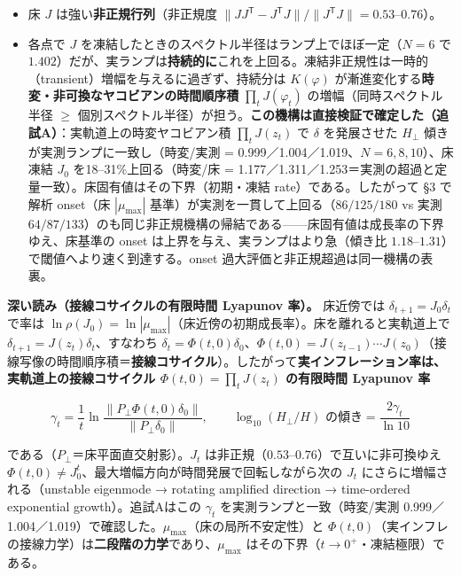 \documentclass[
  a4paper,
]{ltjsarticle}
\providecommand{\tightlist}{%
  \setlength{\itemsep}{0pt}\setlength{\parskip}{0pt}}
\begin{document}
\begin{itemize}
\tightlist
\item
  床 \(J\) は強い\textbf{非正規行列}（非正規度
  \(\|JJ^{\mathsf T}-J^{\mathsf T}J\|/\|J^{\mathsf T}J\|=0.53\)--\(0.76\)）。
\item
  各点で \(J\)
  を凍結したときのスペクトル半径はランプ上でほぼ一定（\(N=6\) で
  \(1.402\)）だが、実ランプは\textbf{持続的に}これを上回る。凍結非正規性は一時的（transient）増幅を与えるに過ぎず、持続分は
  \(K(\varphi)\)
  が漸進変化する\textbf{時変・非可換なヤコビアンの時間順序積}
  \(\prod_t J(\varphi_t)\) の増幅（同時スペクトル半径 \(\ge\)
  個別スペクトル半径）が担う。\textbf{この機構は直接検証で確定した（追試A）}：実軌道上の時変ヤコビアン積
  \(\prod_t J(z_t)\) で \(\delta\) を発展させた \(H_\perp\)
  傾きが実測ランプに一致し（時変/実測 =
  0.999／1.004／1.019、\(N=6,8,10\)）、床凍結 \(J_0\)
  を18--31\%上回る（時変/床 =
  1.177／1.311／1.253＝実測の超過と定量一致）。床固有値はその下界（初期・凍結
  rate）である。したがって §3 で解析 onset（床 \(|\mu_{\max}|\)
  基準）が実測を一貫して上回る（\(86/125/180\) vs 実測
  \(64/87/133\)）のも同じ非正規機構の帰結である------床固有値は成長率の下界ゆえ、床基準の
  onset は上界を与え、実ランプはより急（傾き比
  \(1.18\)--\(1.31\)）で閾値へより速く到達する。onset
  過大評価と非正規超過は同一機構の表裏。
\end{itemize}

\textbf{深い読み（接線コサイクルの有限時間 Lyapunov 率）。} 床近傍では
\(\delta_{t+1}=J_0\delta_t\) で率は
\(\ln\rho(J_0)=\ln|\mu_{\max}|\)（床近傍の初期成長率）。床を離れると実軌道上で
\(\delta_{t+1}=J(z_t)\delta_t\)、すなわち
\(\delta_t=\Phi(t,0)\delta_0\)、\(\Phi(t,0)=J(z_{t-1})\cdots J(z_0)\)（接線写像の時間順序積＝\textbf{接線コサイクル}）。したがって\textbf{実インフレーション率は、実軌道上の接線コサイクル
\(\Phi(t,0)=\prod_t J(z_t)\) の有限時間 Lyapunov 率}

\[\gamma_t=\frac1t\ln\frac{\|P_\perp\Phi(t,0)\delta_0\|}{\|P_\perp\delta_0\|},\qquad \log_{10}(H_\perp/H)\text{ の傾き}=\frac{2\gamma_t}{\ln10}\]

である（\(P_\perp\)＝床平面直交射影）。\(J_t\)
は非正規（\(0.53\)--\(0.76\)）で互いに非可換ゆえ
\(\Phi(t,0)\neq J_0^t\)、最大増幅方向が時間発展で回転しながら次の
\(J_t\) にさらに増幅される（unstable eigenmode → rotating amplified
direction → time-ordered exponential growth）。追試Aはこの \(\gamma_t\)
を実測ランプと一致（時変/実測
0.999／1.004／1.019）で確認した。\(\mu_{\max}\)（床の局所不安定性）と
\(\Phi(t,0)\)（実インフレの接線力学）は\textbf{二段階の力学}であり、\(\mu_{\max}\)
はその下界（\(t\to0^+\)・凍結極限）である。
\end{document}
